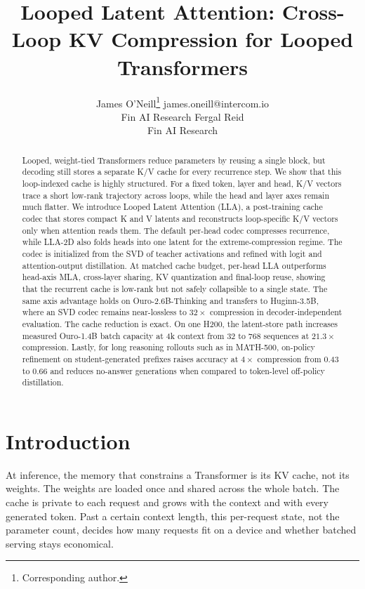 \documentclass[10pt]{article}
\title{Looped Latent Attention: Cross-Loop KV Compression for Looped Transformers}
\author{\name James O'Neill\thanks{Corresponding author.} \email james.oneill@intercom.io \\
\addr Fin AI Research \AND
\name Fergal Reid \\
\addr Fin AI Research}
\newcommand{\lla}{LLA}
\begin{document}
\maketitle

\begin{abstract}
Looped, weight-tied Transformers reduce parameters by reusing a single block, but decoding still stores a separate K/V cache for every recurrence step. We show that this loop-indexed cache is highly structured. For a fixed token, layer and head, K/V vectors trace a short low-rank trajectory across loops, while the head and layer axes remain much flatter. We introduce Looped Latent Attention (\lla{}), a post-training cache codec that stores compact K and V latents and reconstructs loop-specific K/V vectors only when attention reads them. The default per-head codec compresses recurrence, while \lla{}-2D also folds heads into one latent for the extreme-compression regime. The codec is initialized from the SVD of teacher activations and refined with logit and attention-output distillation. At matched cache budget, per-head \lla{} outperforms head-axis MLA, cross-layer sharing, KV quantization and final-loop reuse, showing that the recurrent cache is low-rank but not safely collapsible to a single state. The same axis advantage holds on Ouro-2.6B-Thinking and transfers to Huginn-3.5B, where an SVD codec remains near-lossless to $32\times$ compression in decoder-independent evaluation. The cache reduction is exact. On one H200, the latent-store path increases measured Ouro-1.4B batch capacity at 4k context from 32 to 768 sequences at $21.3\times$ compression. Lastly, for long reasoning rollouts such as in MATH-500, on-policy refinement on student-generated prefixes raises accuracy at $4\times$ compression from 0.43 to 0.66 and reduces no-answer generations when compared to token-level off-policy distillation.
\end{abstract}

\section{Introduction}
\label{sec:intro}
At inference, the memory that constrains a Transformer is its KV cache, not its weights. The weights are loaded once and shared across the whole batch. The cache is private to each request and grows with the context and with every generated token. Past a certain context length, this per-request state, not the parameter count, decides how many requests fit on a device and whether batched serving stays economical.
\end{document}
